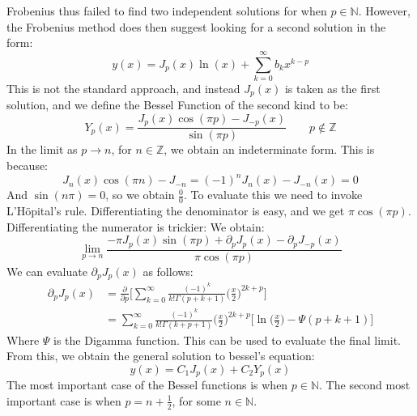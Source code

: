 \documentclass[crop=false,class=book,oneside]{standalone}
\begin{document}
        Frobenius thus failed to find two independent solutions for
        when $p\in\mathbb{N}$. However, the Frobenius method does
        then suggest looking for a second solution in the form:
        \begin{equation}
            y(x)=J_{p}(x)\ln(x)+\sum_{k=0}^{\infty}b_{k}x^{k-p}
        \end{equation}
        This is not the standard approach, and instead $J_{p}(x)$
        is taken as the first solution, and we define the
        Bessel Function of the second kind to be:
        \begin{equation}
            Y_{p}(x)=
            \frac{J_{p}(x)\cos(\pi{p})-J_{\minus{p}}(x)}
                {\sin(\pi{p})}
            \quad\quad
            p\notin\mathbb{Z}
        \end{equation}
        In the limit as $p\rightarrow{n}$, for $n\in\mathbb{Z}$,
        we obtain an indeterminate form. This is because:
        \begin{equation}
            J_{n}(x)\cos(\pi{n})-J_{\minus{n}}=
            (\minus{1})^{n}J_{n}(x)-J_{\minus{n}}(x)=0
        \end{equation}
        And $\sin(n\pi)=0$, so we obtain $\tfrac{0}{0}$. To
        evaluate this we need to invoke L'H\"{o}pital's rule.
        Differentiating the denominator is easy, and we get
        $\pi\cos(\pi{p})$. Differentiating the numerator is trickier:
        We obtain:
        \begin{equation}
            \underset{p\rightarrow{n}}{\lim}
            \frac{-\pi{J}_{p}(x)\sin(\pi{p})+\partial_{p}J_{p}(x)-
                  \partial_{p}J_{\minus{p}}(x)}{\pi\cos(\pi{p})}
        \end{equation}
        We can evaluate $\partial_{p}J_{p}(x)$ as follows:
        \begin{subequations}
            \begin{align}
                \partial_{p}J_{p}(x)&=
                \frac{\partial}{\partial{p}}
                \Big[\sum_{k=0}^{\infty}
                    \frac{(\minus{1})^{k}}{k!\Gamma(p+k+1)}
                    \Big(\frac{x}{2}\Big)^{2k+p}\Big]\\
                &=\sum_{k=0}^{\infty}
                    \frac{(\minus{1})^{k}}{k!\Gamma(k+p+1)}
                    \Big(\frac{x}{2}\Big)^{2k+p}
                    \Big[\ln\big(\frac{x}{2}\big)-\Psi(p+k+1)\Big]
            \end{align}
        \end{subequations}
        Where $\Psi$ is the Digamma function. This can be used
        to evaluate the final limit. From this, we obtain the
        general solution to bessel's equation:
        \begin{equation}
            y(x)=C_{1}J_{p}(x)+C_{2}Y_{p}(x)
        \end{equation}
        The most important case of the Bessel functions is when
        $p\in\mathbb{N}$. The second most important case is when
        $p=n+\frac{1}{2}$, for some $n\in\mathbb{N}$.
\end{document}
